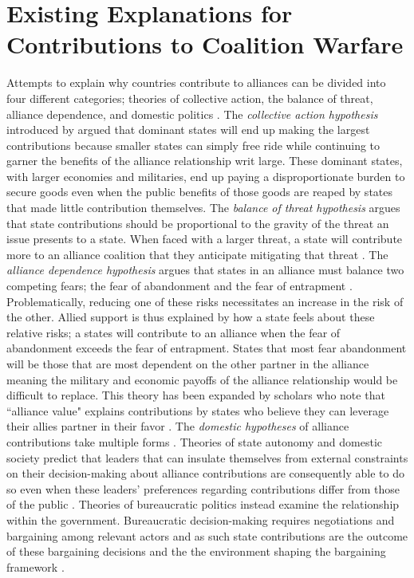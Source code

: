 \documentclass[12pt,letterpaper]{article}
\begin{document}
\section{Existing Explanations for Contributions to Coalition Warfare}
	Attempts to explain why countries contribute to alliances can be divided into four different categories; theories of collective action, the balance of threat, alliance dependence, and domestic politics \citep{bennett_burdensharingpersiangulf_1994, haesebrouck_democraticparticipationair_2016}. The \textit{collective action hypothesis} introduced by \citet{olson_economictheoryalliances_1966} argued that dominant states will end up making the largest contributions because smaller states can simply free ride while continuing to garner the benefits of the alliance relationship writ large. These dominant states, with larger economies and militaries, end up paying a disproportionate burden to secure goods even when the public benefits of those goods are reaped by states that made little contribution themselves. The \textit{balance of threat hypothesis} argues that state contributions should be proportional to the gravity of the threat an issue presents to a state. When faced with a larger threat, a state will contribute more to an alliance coalition that they anticipate mitigating that threat \citep{walt_originsalliance_1987, sandler_natoburdensharing_2014, baltrusaitis_coalitionpoliticsiraq_2010}. The \textit{alliance dependence hypothesis} argues that states in an alliance must balance two competing fears; the fear of abandonment and the fear of entrapment \citep{snyder_securitydilemmaalliance_1984}. Problematically, reducing one of these risks necessitates an increase in the risk of the other. Allied support is thus explained by how a state feels about these relative risks; a states will contribute to an alliance when the fear of abandonment exceeds the fear of entrapment. States that most fear abandonment will be those that are most dependent on the other partner in the alliance meaning the military and economic payoffs of the alliance relationship would be difficult to replace. This theory has been expanded by scholars who note that ``alliance value" explains contributions by states who believe they can leverage their allies partner in their favor \citep{davidson_neoclassicalrealistexplanation_2011}. The \textit{domestic hypotheses} of alliance contributions take multiple forms \citep{ashraf_politicscoalitionburdensharing_2011}. Theories of state autonomy and domestic society predict that leaders that can insulate themselves from external constraints on their decision-making about alliance contributions are consequently able to do so even when these leaders' preferences regarding contributions differ from those of the public \citep{saideman_ambivalentcoalitiondoing_2016, vonhlatky_ideologyballotsalliances_2018}. Theories of bureaucratic politics instead examine the relationship within the government. Bureaucratic decision-making requires negotiations and bargaining among relevant actors and as such state contributions are the outcome of these bargaining decisions and the the environment shaping the bargaining framework \citep{mello_democraticparticipationarmed_2014, rathbun_partisaninterventionseuropean_2004}.
\end{document}
